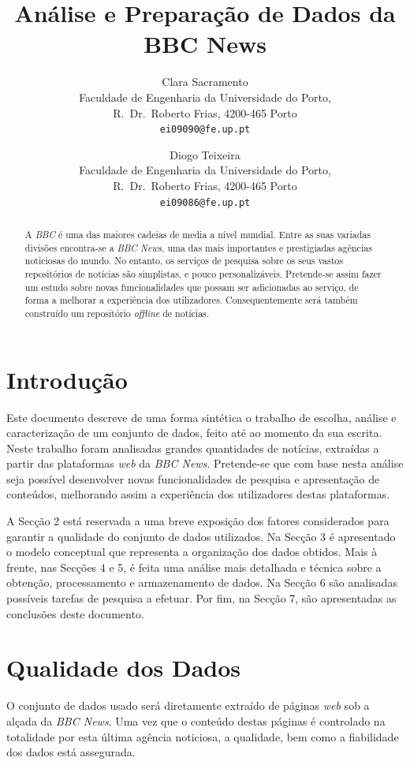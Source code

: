 \documentclass[twocolumn,twoside,10pt,a4paper]{article}
\title{Análise e Preparação de Dados da BBC News}
\author{Clara Sacramento\\
\footnotesize Faculdade de Engenharia da Universidade do Porto,\\[-0.8ex]
\footnotesize R.\ Dr.\ Roberto Frias, 4200-465 Porto\\[-0.8ex]
\small \texttt{ei09090@fe.up.pt}\\
\and
Diogo Teixeira\\
\footnotesize Faculdade de Engenharia da Universidade do Porto,\\[-0.8ex]
\footnotesize R.\ Dr.\ Roberto Frias, 4200-465 Porto\\[-0.8ex]
\small \texttt{ei09086@fe.up.pt}\\
}
\begin{document}
\maketitle

\begin{abstract}

A \textit{BBC} é uma das maiores cadeias de media a nível mundial. Entre as suas variadas divisões encontra-se a \textit{BBC News}, uma das mais importantes e prestigiadas agências noticiosas do mundo. No entanto, os serviços de pesquisa sobre os seus vastos repositórios de notícias são simplistas, e pouco personalizáveis. Pretende-se assim fazer um estudo sobre novas funcionalidades que possam ser adicionadas ao serviço, de forma a melhorar a experiência dos utilizadores. Consequentemente será também construído um repositório \textit{offline} de notícias.

\end{abstract}

\section{Introdução}\label{sec:intro}

Este documento descreve de uma forma sintética o trabalho de escolha, análise e caracterização de um conjunto de dados, feito até ao momento da sua escrita. Neste trabalho foram analisadas grandes quantidades de notícias, extraídas a partir das plataformas \textit{web} da \textit{BBC News}. Pretende-se que com base nesta análise seja possível desenvolver novas funcionalidades de pesquisa e apresentação de conteúdos, melhorando assim a experiência dos utilizadores destas plataformas.

A Secção 2 está reservada a uma breve exposição dos fatores considerados para garantir a qualidade do conjunto de dados utilizados. Na Secção 3 é apresentado o modelo conceptual que representa a organização dos dados obtidos. Mais à frente, nas Secções 4 e 5, é feita uma análise mais detalhada e técnica sobre a obtenção, processamento e armazenamento de dados. Na Secção 6 são analisadas possíveis tarefas de pesquisa a efetuar. Por fim, na Secção 7, são apresentadas as conclusões deste documento.

\section{Qualidade dos Dados}\label{sec:quality}

O conjunto de dados usado será diretamente extraído de páginas \textit{web} sob a alçada da \textit{BBC News}. Uma vez que o conteúdo destas páginas é controlado na totalidade por esta última agência noticiosa, a qualidade, bem como a fiabilidade dos dados está assegurada.
\end{document}
